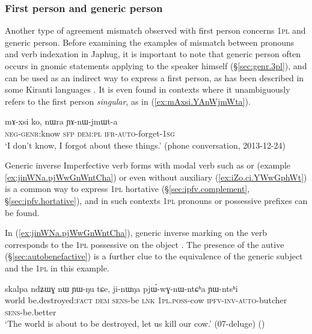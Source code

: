 \subsubsection{First person and generic person} \label{sec:1.genr}
Another type of agreement mismatch observed with first person concerns \textsc{1pl} and generic person. Before examining the examples of mismatch between pronouns and verb indexation in Japhug, it is important to note that generic person often occurs in gnomic statements applying to the speaker himself (§\ref{sec:genr.3pl}), and can be used as an indirect way to express a first person, as has been described in some Kiranti languages \citep{bickel15antipassive}. It is even found in contexts where it unambiguously refers to the first person \textit{singular}, as in (\ref{ex:mAxsi.YAnWjmWta}).

\begin{exe}
\ex   \label{ex:mAxsi.YAnWjmWta}
 \gll mɤ-xsi ko, nɯra ɲɤ-nɯ-jmɯt-a \\
\textsc{neg}-\textsc{genr}:know \textsc{sfp} \textsc{dem}:\textsc{pl} \textsc{ifr}-\textsc{auto}-forget-\textsc{1sg} \\
\glt `I don't know, I forgot about these things.' (phone conversation, 2013-12-24)
\end{exe}

Generic inverse Imperfective verb forms with modal verb such as  or  (example \ref{ex:jinWNa.pjWwGnWntCha}) or even without auxiliary (\ref{ex:iZo.ci.YWwGphWt}) is a common way to express \textsc{1pl} hortative (§\ref{sec:ipfv.complement}, §\ref{sec:ipfv.hortative}), and in such contexts \textsc{1pl} pronouns or possessive prefixes can be found.

In (\ref{ex:jinWNa.pjWwGnWntCha}), generic inverse marking on the verb corresponds to the \textsc{1pl} possessive on the object . The presence of the autive  (§\ref{sec:autobenefactive}) is a further clue to the equivalence of the generic subject and the \textsc{1pl} in this example.

\begin{exe}
\ex   \label{ex:jinWNa.pjWwGnWntCha}
 \gll skalpa ndʑɯɣ nɯ ɲɯ-ŋu tɕe, ji-nɯŋa pjɯ́-wɣ-nɯ-ntɕʰa ɲɯ-ntsʰi \\
world be.destroyed:\textsc{fact} \textsc{dem} \textsc{sens}-be \textsc{lnk} \textsc{1pl}.\textsc{poss}-cow \textsc{ipfv}-\textsc{inv}-\textsc{auto}-butcher \textsc{sens}-be.better \\
\glt `The world is about to be destroyed, let us kill our cow.' (07-deluge) 	()
\end{exe}

